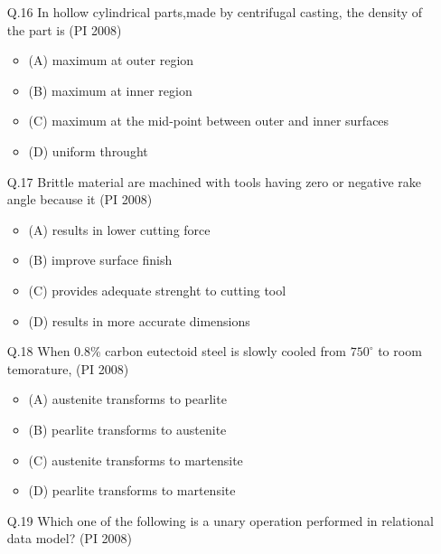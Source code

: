 \documentclass[journal,12pt,onecolumn]{IEEEtran}
\theoremstyle{remark}
\begin{document}
\begin{enumerate}
\begin{multicols}{4}
\begin{enumerate}[label=(\Alph*)]
    \end{enumerate}
\end{multicols}
\vspace{1cm}
\item[\textnormal{Q.16}]  In hollow cylindrical parts,made by centrifugal casting, the density of the part is 
    \hfill{(PI 2008)}
   \begin{itemize}[label={}]
        \item (A) maximum at outer region
        \item (B) maximum at inner region
        \item (C) maximum at the mid-point between outer and inner surfaces
        \item (D) uniform throught
    \end{itemize}
\vspace{1cm}

\item[\textnormal{Q.17}] Brittle material are machined with tools having zero or negative rake angle because it  
    \hfill{(PI 2008)}

\begin{itemize}[label={}]
        \item (A) results in lower cutting force  
        \item (B) improve surface finish
        \item (C) provides adequate strenght to cutting tool
        \item (D) results in more accurate dimensions 
    \end{itemize}
\vspace{1cm}

\item[\textnormal{Q.18}] When 0.8\% carbon eutectoid steel is slowly cooled from $750^{\circ}$ to room temorature,
    \hfill{(PI 2008)}

\begin{itemize}[label={}]
        \item (A) austenite transforms to pearlite
        \item (B) pearlite transforms to austenite
        \item (C) austenite transforms to martensite  
        \item (D) pearlite transforms to martensite
    \end{itemize}
\vspace{1cm}
\item[\textnormal{Q.19}] Which one of the following is a unary operation performed in relational data model?
    \hfill{(PI 2008)}


\end{enumerate}
\end{document}
